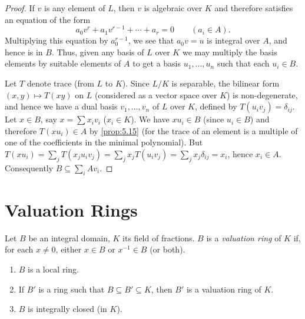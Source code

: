 \begin{proof}
If $v$ is any element of $L$, then $v$ is algebraic over $K$ and therefore satisfies an equation of the form
\[
a_0 v^r + a_1 v^{r-1} + \cdots + a_r = 0 \qquad (a_i \in A).
\]
Multiplying this equation by $a_0^{r-1}$, we see that $a_0 v = u$ is integral over $A$, and hence is in $B$. Thus, given any basis of $L$ over $K$ we may multiply the basis elements by suitable elements of $A$ to get a basis $u_1, \ldots, u_n$ such that each $u_i \in B$.

Let $T$ denote trace (from $L$ to $K$). Since $L/K$ is separable, the bilinear form $(x, y) \mapsto T(xy)$ on $L$ (considered as a vector space over $K$) is non-degenerate, and hence we have a dual basis $v_1, \ldots, v_n$ of $L$ over $K$, defined by $T(u_i v_j) = \delta_{ij}$. Let $x \in B$, say $x = \sum x_i v_i$ ($x_i \in K$). We have $x u_i \in B$ (since $u_i \in B$) and therefore $T(x u_i) \in A$ by \eqref{prop:5.15} (for the trace of an element is a multiple of one of the coefficients in the minimal polynomial). But $T(x u_i) = \sum_j T(x_j u_i v_j) = \sum_j x_j T(u_i v_j) = \sum_j x_j \delta_{ij} = x_i$, hence $x_i \in A$. Consequently $B \subseteq \sum_i A v_i$.
\end{proof}

\section*{Valuation Rings}

Let $B$ be an integral domain, $K$ its field of fractions. $B$ is a \emph{valuation ring} of $K$ if, for each $x \neq 0$, either $x \in B$ or $x^{-1} \in B$ (or both).

\begin{proposition}\label{prop:5.18}
\begin{enumerate}
    \item[i)] $B$ is a local ring.
    \item[ii)] If $B'$ is a ring such that $B \subseteq B' \subseteq K$, then $B'$ is a valuation ring of $K$.
    \item[iii)] $B$ is integrally closed (in $K$).
\end{enumerate}
\end{proposition}

